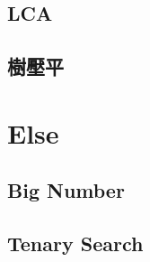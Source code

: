 \subsection{LCA}

\subsection{樹壓平}


\section{Else}
\subsection{Big Number}

\subsection{Tenary Search}
